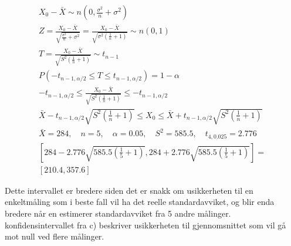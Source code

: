 \begin{gather*}
	X_0 - \bar X \sim n(0, \frac{\sigma^2}{n} + \sigma^2)
	\\
	Z = \frac{X_0 - \bar X}{\sqrt{\frac{\sigma^2}{n} + \sigma^2}} = \frac{X_0 - \bar X}{\sqrt{\sigma^2 \left(\frac{1}{n} + 1\right)}} \sim n(0, 1)
	\\
	T = \frac{X_0 - \bar X}{\sqrt{S^2 \left(\frac{1}{n} + 1\right)}} \sim t_{n - 1}
	\\
	P\left(-t_{n - 1, \alpha / 2} \leq T \leq t_{n - 1, \alpha / 2}\right) = 1 - \alpha
	\\
	-t_{n - 1, \alpha / 2} \leq \frac{X_0 - \bar X}{\sqrt{S^2 \left(\frac{1}{n} + 1\right)}} \leq -t_{n - 1, \alpha / 2}
	\\
	\bar X - t_{n - 1, \alpha / 2} \sqrt{S^2 \left(\frac{1}{n} + 1\right)} \leq X_0 \leq \bar X + t_{n - 1, \alpha / 2} \sqrt{S^2 \left(\frac{1}{n} + 1\right)}
	\\
	\bar X = 284, \quad n = 5, \quad \alpha = 0.05, \quad S^2 = 585.5, \quad t_{4, 0.025} = 2.776
	\\
	\left[284 - 2.776 \sqrt{585.5\left(\frac{1}{5} + 1\right)}, 284 + 2.776 \sqrt{585.5\left(\frac{1}{5} + 1\right)}\right] =
	\\
	\left[210.4, 357.6\right]
\end{gather*}

Dette intervallet er bredere siden det er snakk om usikkerheten til en enkeltmåling som i beste fall vil ha det reelle standardavviket, og blir enda bredere når en estimerer standardavviket fra 5 andre målinger. konfidensintervallet fra c) beskriver usikkerheten til gjennomsnittet som vil gå mot null ved flere målinger.

